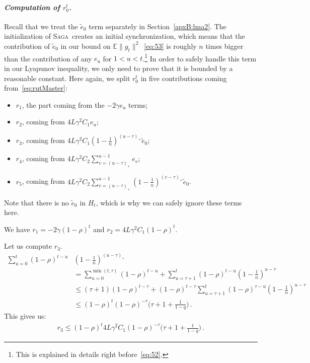 \documentclass[twoside, 11pt]{article}
\newcommand{\stepsize}{\gamma}
\newcommand{\overlap}{\tau}
\newcommand{\contraction}{\rho}
\newcommand{\lipschitz}{L}
\newcommand{\E}{\mathbb{E}}
\newcommand{\SAGA}{\textsc{Saga}}
\begin{document}
\paragraph{\textit{Computation of $r_0^t$.}}
Recall that we treat the $\tilde e_0$ term separately in Section~\ref{apxB:lma2}.
The initialization of \SAGA\ creates an initial synchronization, which means that the contribution of $\tilde e_0$ in our bound on $\E\|g_t\|^2$~\eqref{eq:53} is roughly $n$ times bigger than the contribution of any $e_u$ for $1 < u < t$.\footnote{This is explained in details right before~\eqref{eq:52}.}
In order to safely handle this term in our Lyapunov inequality, we only need to prove that it is bounded by a reasonable constant.
Here again, we split $r_0^t$ in five contributions coming from~\eqref{eq:rutMaster}:
\begin{itemize}
\item $r_1$, the part coming from the $-2\stepsize e_u$ terms;
\item $r_2$, coming from $4\lipschitz\stepsize^2 C_1 e_u$;
\item $r_3$, coming from $4\lipschitz\stepsize^2 C_1 (1 -\frac{1}{n})^{(u -\overlap)_+} \tilde e_0$;
\item $r_4$, coming from $4\lipschitz\stepsize^2 C_2\sum_{v=(u-\overlap)_+}^{u-1} e_v$;
\item $r_5$, coming from $4\lipschitz\stepsize^2 C_2\sum_{v=(u-\overlap)_+}^{u-1} (1 -\frac{1}{n})^{(v -\overlap)_+} \tilde e_0$.
\end{itemize}
Note that there is no $\tilde e_0$ in $H_t$, which is why we can safely ignore these terms here.

We have $r_1 = -2\stepsize (1 -\contraction)^t$ and $r_2=4\lipschitz\stepsize^2 C_1 (1 -\contraction)^t$.

Let us compute $r_3$.
\begin{align}
\sum_{u=0}^t (1 -\contraction)^{t -u} &(1 -\frac{1}{n})^{(u -\overlap)_+}
\nonumber \\
&= \sum_{u=0}^{\min(t, \overlap)} (1 -\contraction)^{t -u}
	+ \sum_{u=\overlap +1}^t (1 -\contraction)^{t -u} (1 -\frac{1}{n})^{u -\overlap}
\nonumber \\
&\leq (\overlap + 1) (1 -\contraction)^{t -\overlap}
	+ (1 -\contraction)^{t -\overlap} \sum_{u=\overlap +1}^t (1 -\contraction)^{\overlap -u} (1 -\frac{1}{n})^{u -\overlap}
\nonumber \\
&\leq (1 -\contraction)^t (1 -\contraction)^{-\overlap}
	\big(
		\overlap + 1 + \frac{1}{1 -q}
	\big)  \, .
\end{align}
This gives us:
\begin{align}
r_3 \leq (1 -\contraction)^t 4\lipschitz\stepsize^2 C_1 (1 -\contraction)^{-\overlap} \big(\overlap + 1 + \frac{1}{1 -q} \big)  \, .
\end{align}
\end{document}
